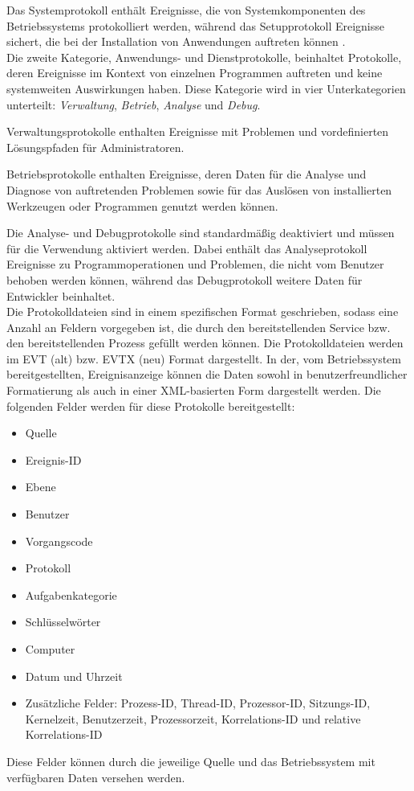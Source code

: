 Das Systemprotokoll enthält Ereignisse, die von Systemkomponenten des Betriebssystems protokolliert werden, während das Setupprotokoll Ereignisse sichert, die bei der Installation von Anwendungen auftreten können \citep{MS2}.\\

Die zweite Kategorie, Anwendungs- und Dienstprotokolle, beinhaltet Protokolle, deren Ereignisse im Kontext von einzelnen Programmen auftreten und keine systemweiten Auswirkungen haben. Diese Kategorie wird in vier Unterkategorien unterteilt: \textit{Verwaltung}, \textit{Betrieb}, \textit{Analyse} und \textit{Debug}. 


Verwaltungsprotokolle enthalten Ereignisse mit Problemen und vordefinierten Lösungspfaden für Administratoren. 

Betriebsprotokolle enthalten Ereignisse, deren Daten für die Analyse und Diagnose von auftretenden Problemen sowie für das Auslösen von installierten Werkzeugen oder Programmen genutzt werden können. 

Die Analyse- und Debugprotokolle sind standardmäßig deaktiviert und müssen für die Verwendung aktiviert werden. Dabei enthält das Analyseprotokoll Ereignisse zu Programmoperationen und Problemen, die nicht vom Benutzer behoben werden können, während das Debugprotokoll weitere Daten für Entwickler beinhaltet. \\

Die Protokolldateien sind in einem spezifischen Format geschrieben, sodass eine Anzahl an Feldern vorgegeben ist, die durch den bereitstellenden Service bzw. den bereitstellenden Prozess gefüllt werden können. Die Protokolldateien werden im EVT (alt) bzw. EVTX (neu) Format dargestellt. In der, vom Betriebssystem bereitgestellten, Ereignisanzeige können die Daten sowohl in benutzerfreundlicher Formatierung als auch in einer XML-basierten Form dargestellt werden. Die folgenden Felder werden für diese Protokolle bereitgestellt:
\begin{itemize}
\item Quelle
\item Ereignis-ID
\item Ebene
\item Benutzer
\item Vorgangscode
\item Protokoll
\item Aufgabenkategorie
\item Schlüsselwörter
\item Computer
\item Datum und Uhrzeit
\item Zusätzliche Felder: Prozess-ID, Thread-ID, Prozessor-ID, Sitzungs-ID, Kernelzeit, Benutzerzeit, Prozessorzeit, Korrelations-ID und relative Korrelations-ID
\end{itemize}
Diese Felder können durch die jeweilige Quelle und das Betriebssystem mit verfügbaren Daten versehen werden.\\ 

